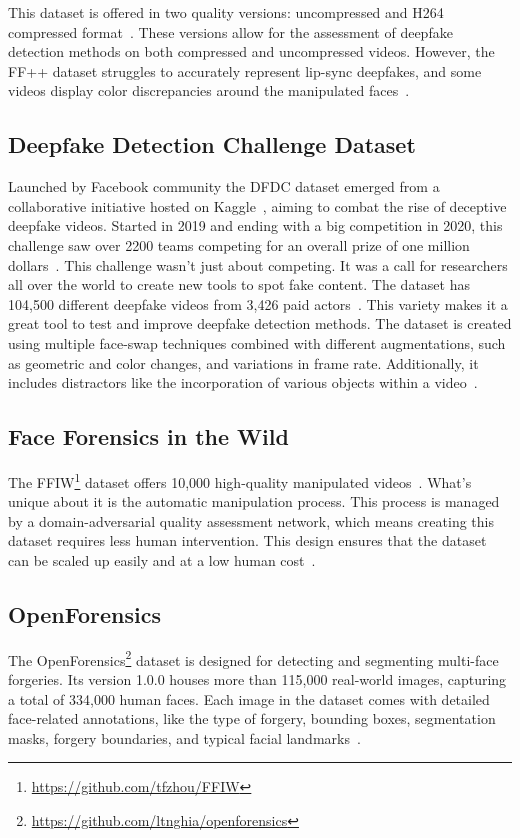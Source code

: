 This dataset is offered in two quality versions: uncompressed and H264~\cite{enwiki:1168205077}
compressed format~\cite{deepfake-dataset}. These versions allow for the assessment of
deepfake detection methods on both compressed and uncompressed videos. However, the \ac{FF++}
dataset struggles to accurately represent lip-sync deepfakes, and some videos display
color discrepancies around the manipulated faces~\cite{deepfake-dataset}.

\subsection{Deepfake Detection Challenge Dataset}
Launched by Facebook community the \ac{DFDC} dataset emerged from a collaborative initiative
hosted on Kaggle~\cite{kaggle2020}, aiming to combat the rise of deceptive deepfake
videos. Started in 2019 and ending with a big competition in 2020, this challenge saw
over 2200 teams competing for an overall prize of one million dollars~\cite{masters-thesis}.
This challenge wasn't just about competing. It was a call for researchers all over the world to create new tools to spot fake
content. The dataset has 104,500 different deepfake videos from 3,426 paid
actors~\cite{dolhansky2020deepfake,masters-thesis}. This variety makes it a great tool to test
and improve deepfake detection methods. The dataset is created using multiple face-swap
techniques combined with different augmentations, such as geometric and color changes,
and variations in frame rate. Additionally, it includes distractors like the incorporation
of various objects within a video~\cite{deepfake-dataset}.

\subsection{Face Forensics in the Wild}
The \ac{FFIW}\footnote{\url{https://github.com/tfzhou/FFIW}} dataset offers 10,000 high-quality
manipulated videos~\cite{Zhou_2021_CVPR}. What's unique about it is the automatic manipulation
process. This process is managed by a domain-adversarial quality assessment network, which
means creating this dataset requires less human intervention. This design ensures that the
dataset can be scaled up easily and at a low human cost~\cite{Zhou_2021_CVPR}.

\subsection{OpenForensics}
The OpenForensics\footnote{\url{https://github.com/ltnghia/openforensics}} dataset is
designed for detecting and segmenting multi-face forgeries.
Its version 1.0.0 houses more than 115,000 real-world images, capturing a total of 334,000 human faces.
Each image in the dataset comes with detailed face-related annotations, like the type
of forgery, bounding boxes, segmentation masks, forgery boundaries, and typical facial
landmarks~\cite{ltnghia-ICCV2021}.


